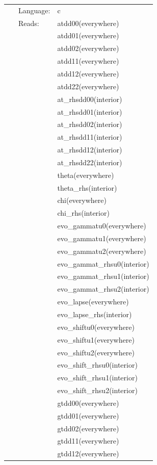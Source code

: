 \documentclass{article}
\begin{document}
 \begin{tabular*}{160mm}{cll} 
~ & Language:  & c \\ 
~ & Reads:  & atdd00(everywhere) \\ 
~& ~ &atdd01(everywhere)\\ 
~& ~ &atdd02(everywhere)\\ 
~& ~ &atdd11(everywhere)\\ 
~& ~ &atdd12(everywhere)\\ 
~& ~ &atdd22(everywhere)\\ 
~& ~ &at\_rhsdd00(interior)\\ 
~& ~ &at\_rhsdd01(interior)\\ 
~& ~ &at\_rhsdd02(interior)\\ 
~& ~ &at\_rhsdd11(interior)\\ 
~& ~ &at\_rhsdd12(interior)\\ 
~& ~ &at\_rhsdd22(interior)\\ 
~& ~ &theta(everywhere)\\ 
~& ~ &theta\_rhs(interior)\\ 
~& ~ &chi(everywhere)\\ 
~& ~ &chi\_rhs(interior)\\ 
~& ~ &evo\_gammatu0(everywhere)\\ 
~& ~ &evo\_gammatu1(everywhere)\\ 
~& ~ &evo\_gammatu2(everywhere)\\ 
~& ~ &evo\_gammat\_rhsu0(interior)\\ 
~& ~ &evo\_gammat\_rhsu1(interior)\\ 
~& ~ &evo\_gammat\_rhsu2(interior)\\ 
~& ~ &evo\_lapse(everywhere)\\ 
~& ~ &evo\_lapse\_rhs(interior)\\ 
~& ~ &evo\_shiftu0(everywhere)\\ 
~& ~ &evo\_shiftu1(everywhere)\\ 
~& ~ &evo\_shiftu2(everywhere)\\ 
~& ~ &evo\_shift\_rhsu0(interior)\\ 
~& ~ &evo\_shift\_rhsu1(interior)\\ 
~& ~ &evo\_shift\_rhsu2(interior)\\ 
~& ~ &gtdd00(everywhere)\\ 
~& ~ &gtdd01(everywhere)\\ 
~& ~ &gtdd02(everywhere)\\ 
~& ~ &gtdd11(everywhere)\\ 
~& ~ &gtdd12(everywhere)\\ 

\end{tabular*}
\end{document}
